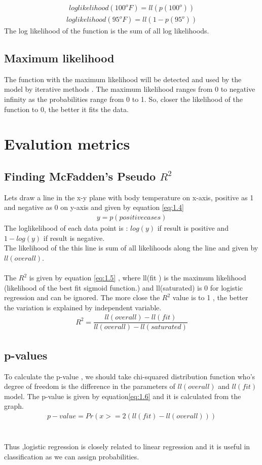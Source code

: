 \documentclass{article}
\begin{document}
     \begin{align}
         loglikelihood(100^o F)=ll(p(100^o))\label{eq:1.2}
     \end{align}
     \begin{align}
         loglikelihood(95^o F)=ll(1-p (95^o))\label{eq:1.3}
     \end{align}
      The log likelihood of the function is the sum of all log likelihoods.

      \subsection{Maximum likelihood }
      The function with the maximum likelihood will be detected and used by the model by iterative methods . The maximum likelihood ranges from 0 to negative infinity as the probabilities range from 0 to 1. So, closer the likelihood of the function to 0, the better it fits the data.  
      \section{Evalution metrics}
      \subsection{Finding McFadden's Pseudo $R^2$}
      Lets draw a line in the x-y plane with body temperature on x-axis, positive as 1 and negative as 0 on y-axis and given by equation \eqref{eq:1.4}
      \begin{align}
          y=p(positive cases)\label{eq:1.4}
      \end{align}
      The loglikelihood of each data point is : $log(y) $ if result is positive and  $1-log(y) $ if result is negative.\\
      The likelihood of the this line is sum of all likelihoods along the line and given by $ll(overall)$. \\\\
      The $R^2$ is given by equation \eqref{eq:1.5} , where ll(fit ) is the maximum likelihood (likelihood of the best fit sigmoid function.) and ll(saturated) is 0 for logistic regression and can be ignored. The more close the $R^2$ value is to 1 , the better the variation is explained by independent variable.
      \begin{align}
          R^2=\dfrac{ll(overall)-ll(fit)}{ll(overall)-ll(saturated)}\label{eq:1.5}
      \end{align}
      \subsection{p-values}
      To calculate the p-value , we should take chi-squared distribution function who's degree of freedom is the difference in the parameters of $ll(overall)$ and $ll(fit)$ model. The p-value is given by equation\eqref{eq:1.6}
and it is calculated from the graph.
\begin{align}
    p-value=Pr(x>= 2(ll(fit)-ll(overall))) \label{eq:1.6}
    \end{align}
    \\\\
    Thus ,logistic regression is closely related to linear regression and it is useful in classification as we can assign probabilities.
\end{document}
